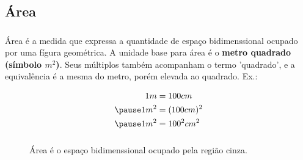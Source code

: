 \documentclass{beamer}
\begin{document}
\subsection{Área}
\begin{frame}\frametitle{\subsecname}
    Área é a medida que expressa a quantidade de espaço bidimenssional ocupado por uma fígura geométrica. A unidade base
    para área é o \textbf{metro quadrado (símbolo ${m^2}$)}. Seus múltiplos também acompanham o termo 'quadrado',
    e a equivalência é a mesma do metro, porém elevada ao quadrado.
    \pause Ex.:

    \begin{align*}
        1m   & = 100cm     \\
        \pause
        1m^2 & = (100cm)^2 \\
        \pause
        1m^2 & = 100^2cm^2
    \end{align*}

\end{frame}


\begin{frame}\frametitle{\subsecname}

    \begin{figure}[H]
        \centering
        \caption{Área é o espaço bidimenssional ocupado pela região cinza.}
        \label{fig:tri_abc}
    \end{figure}
\end{frame}

\end{document}
